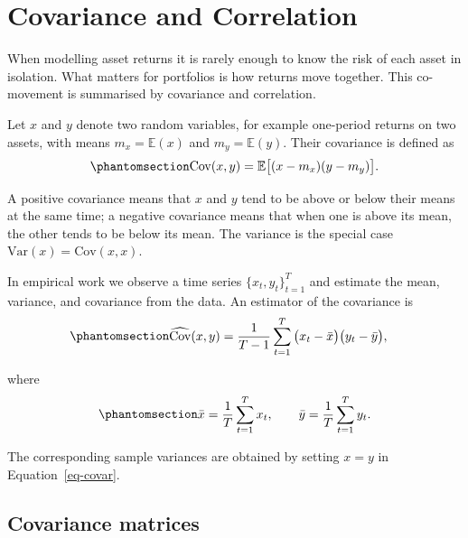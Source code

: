\documentclass[
  letterpaper,
  DIV=11,
  numbers=noendperiod]{scrreprt}
\begin{document}

\chapter{Covariance and Correlation}\label{sec:cov_corr}

When modelling asset returns it is rarely enough to know the risk of
each asset in isolation. What matters for portfolios is how returns move
together. This co-movement is summarised by covariance and correlation.

Let \(x\) and \(y\) denote two random variables, for example one-period
returns on two assets, with means \(m_x = \mathbb{E}(x)\) and
\(m_y = \mathbb{E}(y)\). Their covariance is defined as
\begin{equation}\protect\phantomsection\label{eq-gen-0074}{  
\begin{align}
    \mathrm{Cov}(x,y)  = \mathbb{E}\big[(x - m_x)(y - m_y)\big].
\end{align}
}\end{equation}

A positive covariance means that \(x\) and \(y\) tend to be above or
below their means at the same time; a negative covariance means that
when one is above its mean, the other tends to be below its mean. The
variance is the special case \(\mathrm{Var}(x) = \mathrm{Cov}(x,x)\).

In empirical work we observe a time series \(\{x_t,y_t\}_{t=1}^T\) and
estimate the mean, variance, and covariance from the data. An estimator
of the covariance is
\begin{equation}\protect\phantomsection\label{eq-covar}{  
\begin{align}
    \widehat{\mathrm{Cov}}(x,y)
    &= \frac{1}{T-1} \sum_{t=1}^T
        \big(x_t - \bar{x}\big)\big(y_t - \bar{y}\big),
\end{align}
}\end{equation}

where \begin{equation}\protect\phantomsection\label{eq-gen-0076}{  
\begin{align}
    \bar{x} = \frac{1}{T}\sum_{t=1}^T x_t,
    \qquad
    \bar{y} = \frac{1}{T}\sum_{t=1}^T y_t.
\end{align}
}\end{equation}

The corresponding sample variances are obtained by setting \(x=y\) in
Equation~\ref{eq-covar}.

\section*{Covariance matrices}\label{covariance-matrices}
\end{document}
